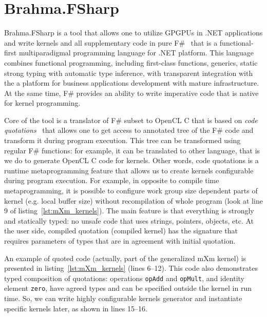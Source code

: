 \section{Brahma.FSharp}

Brahma.FSharp is a tool that allows one to utilize GPGPUs in .NET applications and write kernels and all supplementary code in pure F\#~\cite{fsharp} that is a functional-first multiparadigmal programming language for .NET platform.
This language combines functional programming, including first-class functions, generics, static strong typing with automatic type inference, with transparent integration with the a platform for business applications development with mature infrastructure.
At the same time, F\# provides an ability to write imperative code that is native for kernel programming.

Core of the tool is a translator of F\# subset to OpenCL C that is based on \emph{code quotations}~\cite{FSharpQuotations} that allows one to get access to annotated tree of the F\# code and transform it during program execution.
This tree can be transformed using regular F\# functions: for example, it can be translated to other language, that is we do to generate OpenCL C code for kernels.
Other words, code quotations is a runtime metaprogramming feature that allows us to create kernels configurable during program execution.
For example, in opposite to compile time metaprogramming, it is possible to configure work group size dependent parts of kernel (e.g. local buffer size) without recompilation of whole program (look at line 9 of listing~\ref{lst:mXm_kernels}).
The main feature is that everything is strongly and statically typed: no unsafe code that uses strings, pointers, objects, etc.
At the user side, compiled quotation (compiled kernel) has the signature that requires parameters of types that are in agreement with initial quotation.

An example of quoted code (actually, part of the generalized mXm kernel) is presented in listing~\ref{lst:mXm_kernels} (lines 6--12).
This code also demonstrates typed composition of quotations: operations \verb|opAdd| and \verb|opMult|, and identity element \verb|zero|, have agreed types and can be specified outside the kernel in run time.
So, we can write highly configurable kernels generator and instantiate specific kernels later, as shown in lines 15--16.

